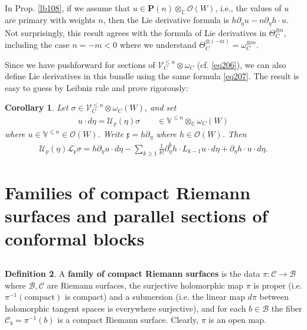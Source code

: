 \documentclass[12pt,a4paper,notitlepage]{article}
\theoremstyle{definition}
\newtheorem{df}{Definition}[section]
\theoremstyle{plain}
\newtheorem{co}[df]{Corollary}
\newcommand{\mc}{\mathcal}
\newcommand{\scr}{\mathscr}
\newcommand{\xk}{\mathfrak x}
\newcommand{\mbf}{\mathbf}
\newcommand{\Vbb}{\mathbb V}
\newcommand{\Cbb}{\mathbb C}
\numberwithin{equation}{section}
\begin{document}
\subsection{}


In Prop. \ref{lb108}, if we assume that  $u\in\mbf P(n)\otimes_\Cbb\scr O(W)$, i.e., the values of $u$ are primary with weights $n$, then the Lie derivative formula is $h\partial_\eta u-n\partial_\eta h\cdot u$. Not surprisingly, this result agrees with the formula of Lie derivatives in $\Theta_C^{\otimes n}$, including the case $n=-m<0$ where we understand $\Theta_C^{\otimes (-m)}=\omega_C^{\otimes m}$.  

Since we have pushforward for sections of $\scr V_C^{\leq n}\otimes\omega_C$ (cf. \eqref{eq206}), we can also define Lie derivatives in this bundle using the same formula \eqref{eq207}. The result is easy to guess by Leibniz rule and prove rigorously:

\begin{co}\label{lb130}
Let $\sigma\in\scr V^{\leq n}_C\otimes\omega_C(W)$, and set
\begin{align*}
u\cdot d\eta=\mc U_\varrho(\eta)\sigma\qquad\in\Vbb^{\leq n}\otimes_\Cbb\omega_C(W)
\end{align*}
where $u\in\Vbb^{\leq n}\in\scr O(W)$. Write $\xk=h\partial_\eta$ where $h\in\scr O(W)$. Then
\begin{align}
\mc U_\varrho(\eta)\mc L_\xk\sigma=h\partial_\eta u\cdot d\eta-\sum_{k\geq1} \frac 1{k!}\partial_\eta^k h\cdot L_{k-1}u\cdot d\eta+\partial_\eta h\cdot u\cdot d\eta.
\end{align}
\end{co}





\section{Families of compact Riemann surfaces and parallel sections of conformal blocks}


\subsection{}


\begin{df}
A \textbf{family of compact Riemann surfaces} is the data $\pi:\mc C\rightarrow\mc B$ where $\mc B,\mc C$ are Riemann surfaces,  the surjective holomorphic map $\pi$ is proper (i.e. $\pi^{-1}(\text{compact})$ is compact) and a submersion (i.e. the linear map $d\pi$ between holomorphic tangent spaces is everywhere surjective), and for each $b\in\mc B$ the fiber $\mc C_b=\pi^{-1}(b)$ \index{Cb@$\mc C_b=\pi^{-1}(b)$, the fiber of $\mc C$ at $b$} is a compact Riemann surface. Clearly, $\pi$ is an open map.
\end{df}
\end{document}
